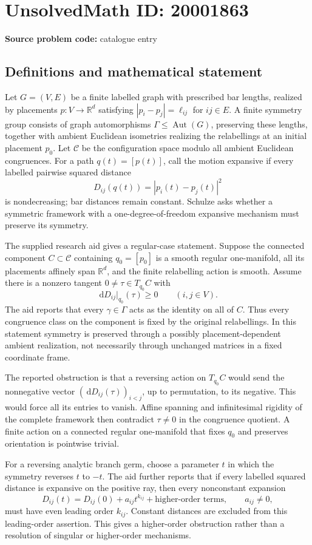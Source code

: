 \documentclass[11pt]{article}
\newcommand{\R}{\mathbb{R}}
\newcommand{\dd}{\,\mathrm{d}}
\begin{document}
\section*{UnsolvedMath ID: 20001863}
\textbf{Source problem code:} catalogue entry
\subsection{Definitions and mathematical statement}
Let \(G=(V,E)\) be a finite labelled graph with prescribed bar lengths, realized by placements \(p:V\to\R^d\) satisfying \(|p_i-p_j|=\ell_{ij}\) for \(ij\in E\). A finite symmetry group consists of graph automorphisms \(\Gamma\leq\operatorname{Aut}(G)\), preserving these lengths, together with ambient Euclidean isometries realizing the relabellings at an initial placement \(p_0\). Let \(\mathcal C\) be the configuration space modulo all ambient Euclidean congruences. For a path \(q(t)=[p(t)]\), call the motion expansive if every labelled pairwise squared distance
\[
D_{ij}(q(t))=|p_i(t)-p_j(t)|^2
\]
is nondecreasing; bar distances remain constant. Schulze asks whether a symmetric framework with a one-degree-of-freedom expansive mechanism must preserve its symmetry.

The supplied research aid gives a regular-case statement. Suppose the connected component \(C\subset\mathcal C\) containing \(q_0=[p_0]\) is a smooth regular one-manifold, all its placements affinely span \(\R^d\), and the finite relabelling action is smooth. Assume there is a nonzero tangent \(0\ne\tau\in T_{q_0}C\) with
\[
\dd D_{ij}|_{q_0}(\tau)\geq0\qquad(i,j\in V).
\]
The aid reports that every \(\gamma\in\Gamma\) acts as the identity on all of \(C\). Thus every congruence class on the component is fixed by the original relabellings. In this statement symmetry is preserved through a possibly placement-dependent ambient realization, not necessarily through unchanged matrices in a fixed coordinate frame.

The reported obstruction is that a reversing action on \(T_{q_0}C\) would send the nonnegative vector \((\dd D_{ij}(\tau))_{i<j}\), up to permutation, to its negative. This would force all its entries to vanish. Affine spanning and infinitesimal rigidity of the complete framework then contradict \(\tau\ne0\) in the congruence quotient. A finite action on a connected regular one-manifold that fixes \(q_0\) and preserves orientation is pointwise trivial.

For a reversing analytic branch germ, choose a parameter \(t\) in which the symmetry reverses \(t\) to \(-t\). The aid further reports that if every labelled squared distance is expansive on the positive ray, then every nonconstant expansion
\[
D_{ij}(t)=D_{ij}(0)+a_{ij}t^{k_{ij}}+\text{higher-order terms},\qquad a_{ij}\ne0,
\]
must have even leading order \(k_{ij}\). Constant distances are excluded from this leading-order assertion. This gives a higher-order obstruction rather than a resolution of singular or higher-order mechanisms.
\end{document}
